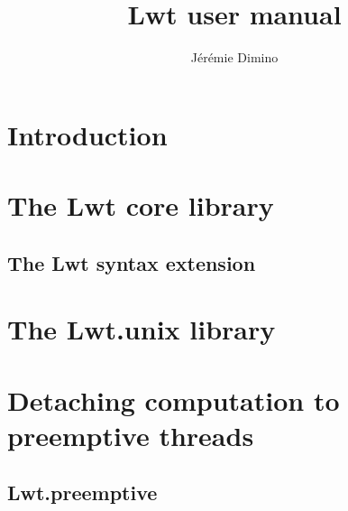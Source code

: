 \documentclass{article}
\title{Lwt user manual}
\author{Jérémie Dimino}
\begin{document}
\maketitle


\setcounter{tocdepth}{2}
\tableofcontents

\section{Introduction}

\section{The Lwt core library}

\subsection{The Lwt syntax extension}

\section{The Lwt.unix library}

\section{Detaching computation to preemptive threads}

\subsection{Lwt.preemptive}
\end{document}
